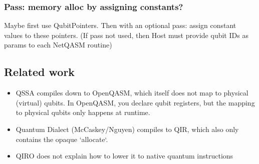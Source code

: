 \subsubsection{Pass: memory alloc by assigning constants?}
Maybe first use QubitPointers. Then with an optional pass: assign constant values to these pointers. (If pass not used, then Host must provide qubit IDs as params to each NetQASM routine)

\subsection{Related work}
\begin{itemize}
\item QSSA compiles down to OpenQASM, which itself does not map to physical (virtual) qubits. In OpenQASM, you declare qubit registers, but the mapping to physical qubits only happens at runtime.
\item Quantum Dialect (McCaskey/Nguyen) compiles to QIR, which also only contains the opaque `allocate`.
\item QIRO does not explain how to lower it to native quantum instructions
\end{itemize}

